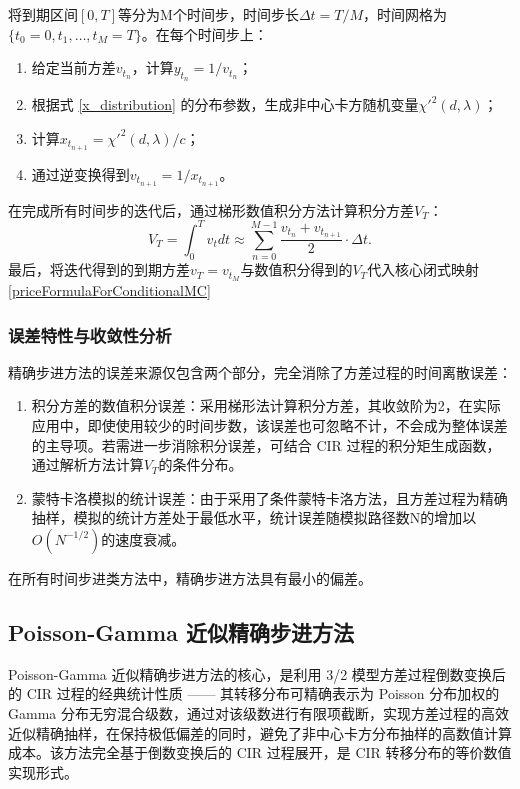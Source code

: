 将到期区间$[0,T]$等分为M个时间步，时间步长$\Delta t=T/M$，时间网格为$\{t_0=0,t_1,\ldots,t_M=T\}$。在每个时间步上：
\begin{enumerate}
  \item 给定当前方差$v_{t_n}$，计算$y_{t_n} = 1/v_{t_n}$；
  \item 根据式 \eqref{x_distribution} 的分布参数，生成非中心卡方随机变量$\chi'^2 (d,\lambda)$；
  \item 计算$x_{t_{n+1}} = \chi'^2 (d,\lambda)/c$；
  \item 通过逆变换得到$v_{t_{n+1}} = 1/x_{t_{n+1}}$。
\end{enumerate}
在完成所有时间步的迭代后，通过梯形数值积分方法计算积分方差$V_T$：
\begin{equation}
  V_T = \int_0^T v_t dt \approx \sum_{n=0}^{M-1} \frac{v_{t_n} + v_{t_{n+1}}}{2} \cdot \Delta t.
\end{equation}
最后，将迭代得到的到期方差$v_T=v_{t_M}$与数值积分得到的$V_T$代入核心闭式映射\eqref{priceFormulaForConditionalMC}
\subsubsection{误差特性与收敛性分析}
精确步进方法的误差来源仅包含两个部分，完全消除了方差过程的时间离散误差：
\begin{enumerate}
  \item 积分方差的数值积分误差：采用梯形法计算积分方差，其收敛阶为2，在实际应用中，即使使用较少的时间步数，该误差也可忽略不计，不会成为整体误差的主导项。若需进一步消除积分误差，可结合 CIR 过程的积分矩生成函数，通过解析方法计算$V_T$​的条件分布。
  \item 蒙特卡洛模拟的统计误差：由于采用了条件蒙特卡洛方法，且方差过程为精确抽样，模拟的统计方差处于最低水平，统计误差随模拟路径数N的增加以$O(N^{-1/2})$的速度衰减。
\end{enumerate}
在所有时间步进类方法中，精确步进方法具有最小的偏差。

\subsection{Poisson-Gamma 近似精确步进方法}
Poisson-Gamma 近似精确步进方法的核心，是利用 3/2 模型方差过程倒数变换后的 CIR 过程的经典统计性质 —— 其转移分布可精确表示为 Poisson 分布加权的 Gamma 分布无穷混合级数，通过对该级数进行有限项截断，实现方差过程的高效近似精确抽样，在保持极低偏差的同时，避免了非中心卡方分布抽样的高数值计算成本。该方法完全基于倒数变换后的 CIR 过程展开，是 CIR 转移分布的等价数值实现形式。


